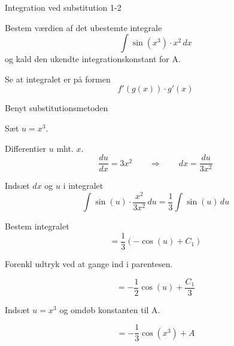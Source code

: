 \documentclass{article}
\begin{document}
\begin{exercise}{Integration ved substitution 1-2}


Bestem værdien af det ubestemte integrale
\[
\int \sin(x^3) \cdot x^2 \, dx
\]
og kald den ukendte integrationskonstant for A.




\hint

Se at integralet er på formen
\[
f'(g(x)) \cdot g'(x)
\]

\hint

Benyt substitutionsmetoden

\hint

Sæt $u=x^3$.


\hint

Differentier $u$ mht. $x$.
\[
\frac{du}{dx} = 3x^2 \qquad\Rightarrow \qquad dx = \frac{du}{3x^2}
\]

\hint

Indsæt $dx$ og $u$ i integralet
\[
\int \sin(u) \cdot \frac{x^2}{3x^2} \, du = \frac{1}{3} \int \sin(u) \, du
\]

\hint

Bestem integralet
\[
= \frac{1}{3} \left(- \cos(u) + C_1 \right)
\]

\hint
Forenkl udtryk ved at gange ind i parentesen.

\hint

\[
= - \frac{1}{2} \cos(u) + \frac{C_1}{3}
\]

\hint

Indsæt $u = x^3$ og omdøb konstanten til A.

\hint

\[
= - \frac{1}{3} \cos(x^3) + A
\]


\end{exercise}

\newpage
\end{document}
